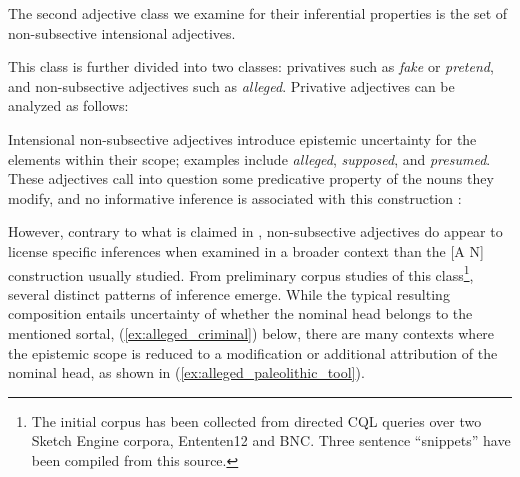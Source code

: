 \documentclass[10pt]{article}
\begin{document}
\vspace {-1.5mm}

The second adjective class we examine for their inferential properties is the set of non-subsective intensional adjectives. 

This class is further divided into two classes: privatives such as {\it fake} or {\it pretend}, and non-subsective adjectives such as \emph{alleged}. 
Privative adjectives can be analyzed as follows:
\vspace{-0.5em}
\vspace{-0.5em}

\noindent
Intensional non-subsective adjectives introduce epistemic uncertainty for the elements within their scope; 
examples include \emph{alleged}, \emph{supposed}, and \emph{presumed}. These adjectives call 
into question some predicative property of the nouns they modify, and no informative inference is associated with this construction \cite{Kamp95prototypetheory}:
\vspace{-.5em}
\vspace{-0.5em}

\noindent However, contrary to what is claimed in \cite{amoia2006adjective}, non-subsective adjectives do appear to license specific inferences when examined in a broader context than the [A N] construction usually studied. From preliminary corpus studies of this class\footnote{The initial corpus has been collected from directed CQL queries over  two Sketch Engine corpora, Ententen12 and BNC. Three sentence ``snippets'' have been compiled from this source.}, several distinct patterns of inference emerge. While the typical resulting composition entails  uncertainty of 
 whether the nominal head belongs to the mentioned sortal, (\ref{ex:alleged_criminal}) below, there are many contexts where the epistemic scope is reduced to  a modification or additional attribution of the nominal head, as shown in  (\ref{ex:alleged_paleolithic_tool}). 

\vspace{-0.5em}
\vspace{-0.5em}
\end{document}
